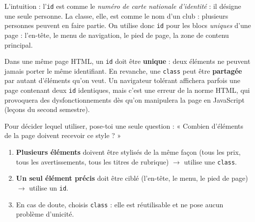 \documentclass[11pt]{article}
\begin{document}
L'intuition : l'\texttt{id} est comme le \emph{numéro de carte nationale d'identité} : il désigne une seule personne. La classe, elle, est comme le nom d'un club : plusieurs personnes peuvent en faire partie. On utilise donc \texttt{id} pour les blocs \emph{uniques} d'une page : l'en-tête, le menu de navigation, le pied de page, la zone de contenu principal.

\begin{propriete}
Dans une même page HTML, un \texttt{id} doit être \textbf{unique} : deux éléments ne peuvent jamais porter le même identifiant. En revanche, une \texttt{class} peut être \textbf{partagée} par autant d'éléments qu'on veut. Un navigateur tolérant affichera parfois une page contenant deux \texttt{id} identiques, mais c'est une erreur de la norme HTML, qui provoquera des dysfonctionnements dès qu'on manipulera la page en JavaScript (leçons du second semestre).
\end{propriete}

\begin{methode}
Pour décider lequel utiliser, pose-toi une seule question : « Combien d'éléments de la page doivent recevoir ce style ? »
\begin{enumerate}
\item \textbf{Plusieurs éléments} doivent être stylisés de la même façon (tous les prix, tous les avertissements, tous les titres de rubrique) $\rightarrow$ utilise une \texttt{class}.
\item \textbf{Un seul élément précis} doit être ciblé (l'en-tête, le menu, le pied de page) $\rightarrow$ utilise un \texttt{id}.
\item En cas de doute, choisis \texttt{class} : elle est réutilisable et ne pose aucun problème d'unicité.
\end{enumerate}
\end{methode}
\end{document}
